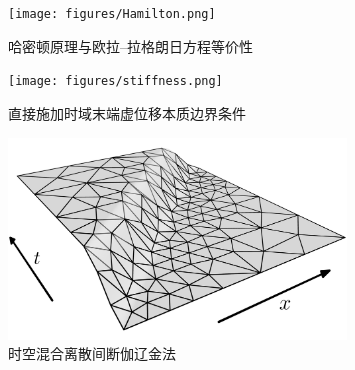\begin{figure}[!h]
    \centering 
    \texttt{[image: figures/Hamilton.png]}
    \caption{哈密顿原理与欧拉--拉格朗日方程等价性}
    \label{fg:hamilton}
\end{figure}

\begin{figure}[!h]
    \centering 
    \texttt{[image: figures/stiffness.png]}
    \caption{直接施加时域末端虚位移本质边界条件}
    \label{fg:direct}
\end{figure}

\begin{figure}[!h]
    \centering 
    \includegraphics[width=0.8\textwidth]{figures/wave.png}
    \caption{时空混合离散间断伽辽金法}
    \label{fg:slab}
\end{figure}


